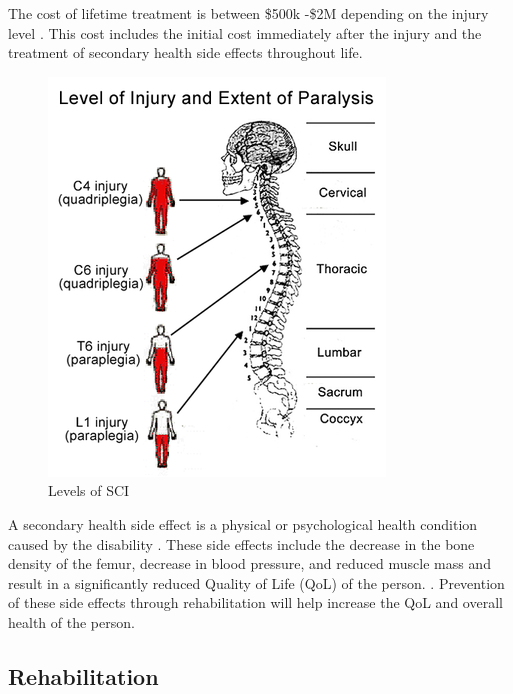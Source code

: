 The cost of lifetime treatment is between \$500k -\$2M depending on the injury level \cite{mcdonald2002spinal}. This cost includes the initial cost immediately after the injury and the treatment of secondary health side effects throughout life.  

 

\begin{figure}
    \centering
    \includegraphics[scale=0.6]{images/background/SCI.png}
    \caption[Levels of SCI]{Levels of SCI \cite{sadaka2012bradycardia}}
    \label{fig:SCILevels}
\end{figure}

A secondary health side effect is a physical or psychological health condition caused by the disability \cite{jensen2012secondary}. These side effects include the decrease in the bone density of the femur, decrease in blood pressure, and reduced muscle mass \cite{haisma2007complications} \cite{hitzig2010understanding} and result in a significantly reduced Quality of Life (QoL) of the person.  	\cite{craven2012impact}. Prevention of these side effects through rehabilitation will help increase the QoL and overall health of the person.  








\subsection{Rehabilitation}
\label{sec:rehab}

